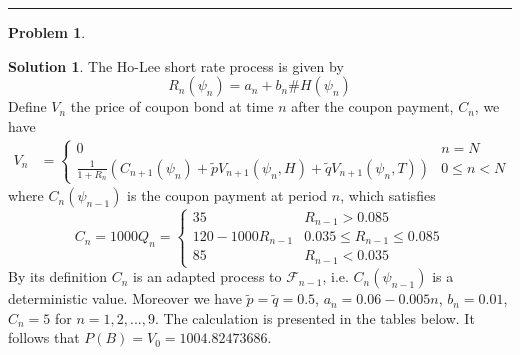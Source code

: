 \documentclass[a4paper, 10pt]{article}
\theoremstyle{definition}
\newtheorem{problem}{Problem}
\theoremstyle{hSol}
\newtheorem*{solution}{Solution}
\begin{document}
\noindent\rule{16cm}{0.4pt}
\begin{problem} 
\end{problem}
\begin{solution} The Ho-Lee short rate process is given by
\begin{equation}
  R_n(\psi_n) = a_n + b_n\#H(\psi_n)
\end{equation}
Define $V_n$ the price of coupon bond at time $n$ after the coupon payment, $C_n$, we have
\begin{equation}
  \begin{split}
  V_n 
  &=\begin{cases}
  0 & n=N\\
  \frac{1}{1+R_{n}}\left(C_{n+1}(\psi_n) + \tilde{p}V_{n+1}(\psi_n, H) + \tilde{q}V_{n+1}(\psi_n, T)\right) & 0\leq n < N
  \end{cases}
  \end{split}
\end{equation}
where $C_n(\psi_{n-1})$ is the coupon payment at period $n$, which satisfies
\begin{equation}
  C_n = 1000Q_n = \begin{cases}
  35 & R_{n-1}>0.085 \\
  120 - 1000R_{n-1} & 0.035\leq R_{n-1} \leq 0.085\\
  85 & R_{n-1}<0.035
  \end{cases}
\end{equation}
By its definition $C_n$ is an adapted process to $\mathcal{F}_{n-1}$, i.e. $C_{n}(\psi_{n-1})$ is a deterministic value. Moreover we have $\tilde{p}=\tilde{q}=0.5$, $a_n=0.06-0.005n$, $b_n=0.01$, $C_{n}=5$ for $n=1,2,...,9$. The calculation is presented in the tables below. It follows that $P(B)=V_0=1004.82473686$.

\begin{landscape}


\end{landscape}
\end{solution}
\end{document}
